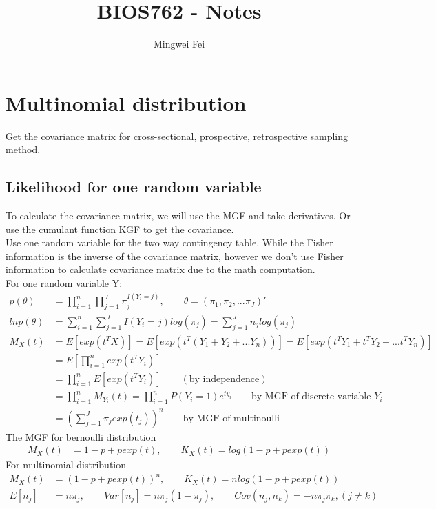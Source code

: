 \documentclass[11pt]{article} %
\title{BIOS762 - Notes}
\author{Mingwei Fei}
\begin{document}
	
	\maketitle
	
	\section{Multinomial distribution}
	Get the covariance matrix for cross-sectional, prospective, retrospective sampling method.\\
	\subsection{Likelihood for one random variable}
	To calculate the covariance matrix, we will use the MGF and take derivatives. Or use the cumulant function KGF to get the covariance.\\
	Use one random variable for the two way contingency table. While the Fisher information is the inverse of the covariance matrix, however we don't use Fisher information to calculate covariance matrix due to the math computation.\\
	For one random variable Y:
	\begin{align*}
		p(\theta) &= \prod_{i=1}^n \prod_{j=1}^J \pi_{j}^{I(Y_{i} = j)}, \qquad \theta = (\pi_1, \pi_2, ... \pi_J)'\\
		ln p(\theta) &= \sum_{i=1}^n \sum_{j=1}^J I(Y_{i}=j)log( \pi_{j}) = \sum_{j=1}^J n_j log(\pi_{j})\\
		M_X(t) &= E[exp(t^TX)] = E[exp(t^T(Y_1 + Y_2 +... Y_n))] = E[exp(t^TY_1 + t^TY_2 + ... t^TY_n)]\\
		&= E[\prod_{i=1}^n exp(t^TY_i)]\\
		&= \prod_{i=1}^n E[exp(t^TY_i)]  \qquad (\text{by independence})\\
		&= \prod_{i=1}^n M_{Y_i}(t) = \prod_{i=1}^n P(Y_i= 1) e^{ty_i}\qquad  \text{by MGF of discrete variable $Y_i$}\\
		&= \left( \sum_{j=1}^J \pi_j exp(t_j)\right)^n \qquad \text{by MGF of multinoulli}
	\end{align*}
	The MGF for bernoulli distribution
	\begin{align*}
		M_X(t) &= 1-p + p exp(t), \qquad K_X(t) = log (1-p + p exp(t))
	\end{align*}
	For multinomial distribution
	\begin{align*}
		M_X(t) &= (1-p + p exp(t))^n, \qquad K_X(t) = n log (1-p + p exp(t))\\
		E[n_j] &= n\pi_j, \qquad Var[n_j] = n\pi_j(1-\pi_j), \qquad Cov(n_j, n_k) = -n\pi_j\pi_k, {(j \neq k)}
	\end{align*}    
\end{document}
